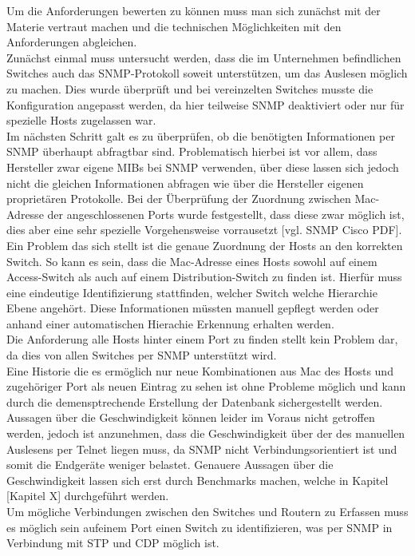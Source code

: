 Um die Anforderungen bewerten zu können muss man sich zunächst mit der Materie vertraut machen und die technischen Möglichkeiten mit den Anforderungen abgleichen.\\
Zunächst einmal muss untersucht werden, dass die im Unternehmen befindlichen Switches auch das SNMP-Protokoll soweit unterstützen, um das Auslesen möglich zu machen. Dies wurde überprüft und bei vereinzelten Switches musste die Konfiguration angepasst werden, da hier teilweise SNMP deaktiviert oder nur für spezielle Hosts zugelassen war.\\
Im nächsten Schritt galt es zu überprüfen, ob die benötigten Informationen per SNMP überhaupt abfragtbar sind. Problematisch hierbei ist vor allem, dass Hersteller zwar eigene MIBs bei SNMP verwenden, über diese lassen sich jedoch nicht die gleichen Informationen abfragen wie über die Hersteller eigenen proprietären Protokolle. Bei der Überprüfung der Zuordnung zwischen Mac-Adresse der angeschlossenen Ports wurde festgestellt, dass diese zwar möglich ist, dies aber eine sehr spezielle Vorgehensweise vorrausetzt [vgl. SNMP Cisco PDF].\\
Ein Problem das sich stellt ist die genaue Zuordnung der Hosts an den korrekten Switch. So kann es sein, dass die Mac-Adresse eines Hosts sowohl auf einem Access-Switch als auch auf einem Distribution-Switch zu finden ist. Hierfür muss eine eindeutige Identifizierung stattfinden, welcher Switch welche Hierarchie Ebene angehört. Diese Informationen müssten manuell gepflegt werden oder anhand einer automatischen Hierachie Erkennung erhalten werden.\\
Die Anforderung alle Hosts hinter einem Port zu finden stellt kein Problem dar, da dies von allen Switches per SNMP unterstützt wird. \\
Eine Historie die es ermöglich nur neue Kombinationen aus Mac des Hosts und zugehöriger Port als neuen Eintrag zu sehen ist ohne Probleme möglich und kann durch die demensptrechende Erstellung der Datenbank sichergestellt werden.\\
Aussagen über die Geschwindigkeit können leider im Voraus nicht getroffen werden, jedoch ist anzunehmen, dass die Geschwindigkeit über der des manuellen Auslesens per Telnet liegen muss, da SNMP nicht Verbindungsorientiert ist und somit die Endgeräte weniger belastet. Genauere Aussagen über die Geschwindigkeit lassen sich erst durch Benchmarks machen, welche in Kapitel [Kapitel X] durchgeführt werden.\\
Um mögliche Verbindungen zwischen den Switches und Routern zu Erfassen muss es möglich sein aufeinem Port einen Switch zu identifizieren, was per SNMP in Verbindung mit STP und CDP möglich ist.\\
